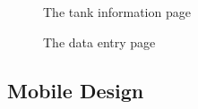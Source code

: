     \begin{figure}[H]
        \centering
        \caption{The tank information page}
        \label{tank-page}
    \end{figure}
    \begin{figure}[H]
        \centering
        \caption{The data entry page}
        \label{data-page}
    \end{figure}
    
    \subsection{Mobile Design}
    

